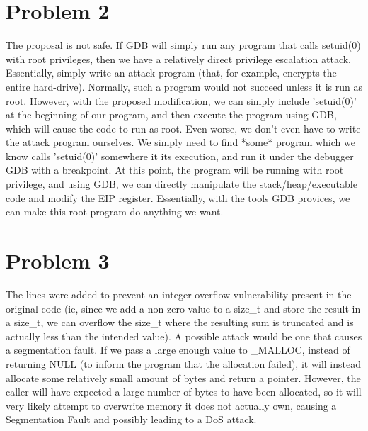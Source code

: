 \documentclass[12pt]{article}
\begin{document}
\section*{Problem 2}
The proposal is not safe. If GDB will simply run any program that calls setuid(0) with root privileges, then we have a relatively direct privilege escalation attack. Essentially, simply write an attack program (that, for example, encrypts the entire hard-drive). Normally, such a program would not succeed unless it is run as root. However, with the proposed modification, we can simply include 'setuid(0)' at the beginning of our program, and then execute the program using GDB, which will cause the code to run as root. Even worse, we don't even have to write the attack program ourselves. We simply need to find *some* program which we know calls 'setuid(0)' somewhere it its execution, and run it under the debugger GDB with a breakpoint. At this point, the program will be running with root privilege, and using GDB, we can directly manipulate the stack/heap/executable code and modify the EIP register. Essentially, with the tools GDB provices, we can make this root program do anything we want.

\pagebreak
\section*{Problem 3}
The lines were added to prevent an integer overflow vulnerability present in the original code (ie, since we add a non-zero value to a size\_t and store the result in a size\_t, we can overflow the size\_t where the resulting sum is truncated and is actually less than the intended value). A possible attack would be one that causes a segmentation fault. If we pass a large enough value to \_MALLOC, instead of returning NULL (to inform the program that the allocation failed), it will instead allocate some relatively small amount of bytes and return a pointer. However, the caller will have expected a large number of bytes to have been allocated, so it will very likely attempt to overwrite memory it does not actually own, causing a Segmentation Fault and possibly leading to a DoS attack.

\pagebreak
\end{document}
